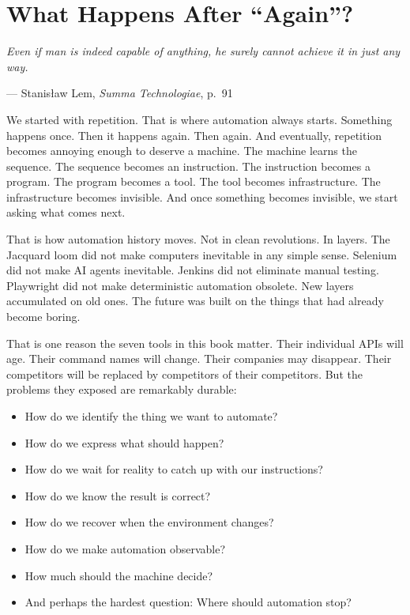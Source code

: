 \documentclass[11pt,twoside]{book}
\providecommand{\epigraphlem}[2]{%
  \begin{flushright}\begin{minipage}{0.72\textwidth}\raggedleft
  \itshape #1\par\vspace{0.4em}\normalfont\small --- #2
  \end{minipage}\end{flushright}\vspace{1.2em}}
\begin{document}
\chapter*{What Happens After ``Again''?}

\epigraphlem{Even if man is indeed capable of anything, he surely cannot achieve it in just any way.}{Stanisław Lem, \textit{Summa Technologiae}, p.~91}


We started with repetition.
That is where automation always starts.
Something happens once.
Then it happens again.
Then again.
And eventually, repetition becomes annoying enough to deserve a machine.
The machine learns the sequence.
The sequence becomes an instruction.
The instruction becomes a program.
The program becomes a tool.
The tool becomes infrastructure.
The infrastructure becomes invisible.
And once something becomes invisible, we start asking what comes next.

That is how automation history moves.
Not in clean revolutions.
In layers.
The Jacquard loom did not make computers inevitable in any simple sense. Selenium did not make AI agents inevitable. Jenkins did not eliminate manual testing. Playwright did not make deterministic automation obsolete.
New layers accumulated on old ones.
The future was built on the things that had already become boring.

That is one reason the seven tools in this book matter.
Their individual APIs will age.
Their command names will change.
Their companies may disappear.
Their competitors will be replaced by competitors of their competitors.
But the problems they exposed are remarkably durable:
\begin{itemize}[nosep]
    \item How do we identify the thing we want to automate?
    \item How do we express what should happen?
    \item How do we wait for reality to catch up with our instructions?
    \item How do we know the result is correct?
    \item How do we recover when the environment changes?
    \item How do we make automation observable?
    \item How much should the machine decide?
    \item And perhaps the hardest question: Where should automation stop?
\end{itemize}
\end{document}
